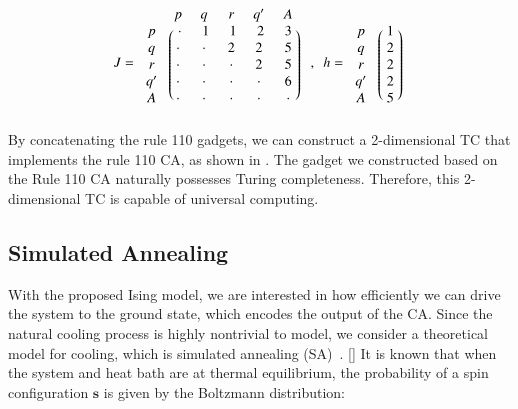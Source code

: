 \documentclass[twocolumn,superscriptaddress,english,showpacs,longbibliography]{revtex4-2}
\newcommand{\jinguo}[1]{[{\color{blue}{JGL: #1}}]}
\newcommand{\ym}[1]{[{\color{red}{YM: #1}}]}
\begin{document}
\begin{equation}
J = \begin{blockarray}{cccccc}
& p & q & r & q^\prime & A\\
\begin{block}{c(ccccc)}
p & ~\cdot~ & ~1~ & ~1~ & ~2~ & ~3~\\
q & \cdot & \cdot & 2 & 2 & 5\\
r & \cdot & \cdot & \cdot & 2 & 5\\
q^\prime & \cdot & \cdot & \cdot & \cdot & 6\\
A & \cdot & \cdot & \cdot & \cdot & \cdot\\
\end{block}
\end{blockarray}
~~, ~~h = \begin{blockarray}{cc}
& \phantom{x} \\
\begin{block}{c(c)}
p & ~1~\\
q & 2\\
r & 2\\
q^\prime & 2\\
A & 5\\
\end{block}
\end{blockarray}
\end{equation}
By concatenating the rule 110 gadgets, we can construct a 2-dimensional TC that implements the rule 110 CA, as shown in .
The gadget we constructed based on the Rule 110 CA naturally possesses Turing completeness. Therefore, this 2-dimensional TC is capable of universal computing.

\subsection{Simulated Annealing}

With the proposed Ising model, we are interested in how efficiently we can drive the system to the ground state, which encodes the output of the CA.
Since the natural cooling process is highly nontrivial to model, we consider a theoretical model for cooling, which is simulated annealing (SA)~\cite{Kirkpatrick1983}.
\jinguo{random fluctuations may be linear in time considering the parallelism of the system.}
It is known that when the system and heat bath are at thermal equilibrium, 
the probability of a spin configuration $\mathbf{s}$ is given by the Boltzmann distribution:
\end{document}
